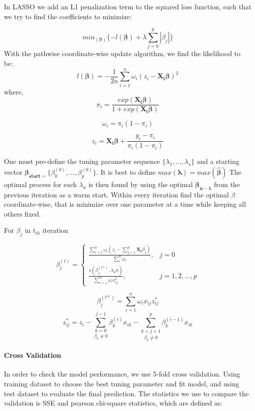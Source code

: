 \documentclass[]{article}
\let\oldparagraph\paragraph
\renewcommand{\paragraph}[1]{\oldparagraph{#1}\mbox{}}
\begin{document}
In LASSO we add an L1 penalization term to the squared loss function,
such that we try to find the coefficients to minimize:

\[min _{(\boldsymbol \beta)}\{-l({\boldsymbol \beta})+\lambda\sum_{j=0}^{p}|\beta_j| \}\]
With the pathwise coordinate-wise update algorithm, we find the
likelihood to be:
\[l({\boldsymbol \beta}) = -\frac{1}{2n}\sum_{i=1}^{n}\omega_i(z_i-{\boldsymbol {X_i\beta}})^2\]
where,
\[\pi_i = \frac{exp({\boldsymbol {X_i\beta}})}{1+exp({\boldsymbol {X_i\beta}})}\]

\[\omega_i = \pi_i(1-\pi_i)\]

\[z_i = {\boldsymbol {X_i\beta}}+\frac{y_i-\pi_i}{\pi_i(1-\pi_i)}\]

One must pre-define the tuning parameter sequence
\(\{\lambda_1,...,\lambda_s\}\) and a starting vector
\({\boldsymbol{\beta_{start=}}}\{\beta_0^{(0)},...,\beta_p^{(0)}\}\). It
is best to define
\(max{(\boldsymbol \lambda)} = max(\boldsymbol\hat{\beta})\) The optimal
process for each \(\lambda_u\) is then found by using the optimal
\(\boldsymbol {\beta_{u-1}}\) from the previous iteration as a warm
start. Within every iteration find the optimal \(\beta\)
coordinate-wise, that is minimize over one parameter at a time while
keeping all others fixed.

For \(\beta_j\) in \(t_{th}\) iteration

\[\beta_j^{(t)} = \left\{\begin{array}{lc} \frac{\sum_{i=1}^{n} \omega_i(z_i-\sum_{j=1}^{p}{\boldsymbol {X_i}\beta_j})}{\sum_{i}^{n}\omega_i},&j=0\\\frac{s(\beta_j^{(t*)},\lambda_un)}{\sum_{i=1}^{n}\omega_ix_{ij}^2},&j = 1,2,...,p\end{array}\right.\]

\[\beta_j^{(t*)} = \sum_{i=1}^{n}\omega_ix_{ij}z_{ij}^*\]
\[z_{ij}^* = z_i-\underset {\beta_k\neq0}{\sum_{k = 0}^{j-1}}\beta_k^{(i)}x_{ik}-\underset {\beta_k\neq0}{\sum_{k=j+1}^{p}}\beta_k^{(i-1)}x_{ik}\]

\hypertarget{cross-validation}{%
\paragraph{Cross Validation}\label{cross-validation}}

In order to check the model performance, we use 5-fold cross validation.
Using training dataset to choose the best tuning parameter and fit
model, and using test dataset to evaluate the final prediction. The
statistics we use to compare the validation is SSE and pearson
chi-square statistics, which are defined as:
\end{document}
